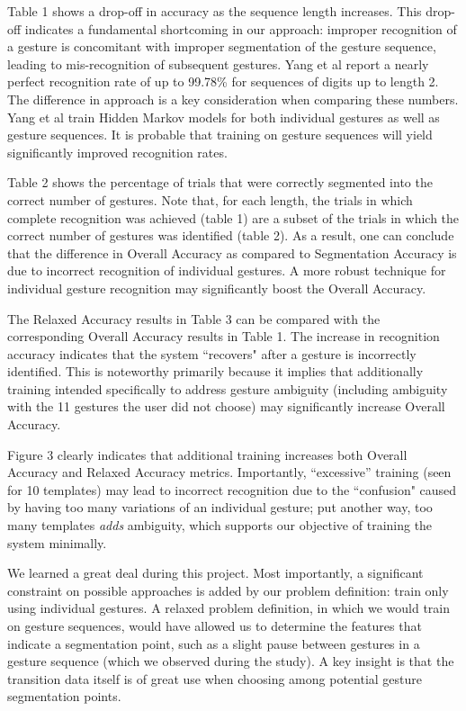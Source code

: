 \documentclass[twoside]{article}
\begin{document}
\begin{multicols}{2}
Table 1 shows a drop-off in accuracy as the sequence length increases. This
drop-off indicates a fundamental shortcoming in our approach: improper
recognition of a gesture is concomitant with improper segmentation of the
gesture sequence, leading to mis-recognition of subsequent gestures. Yang et al
\cite{yang_gesture_1994} report a nearly perfect recognition rate of up to
99.78\% for sequences of digits up to length 2. The difference in approach is a
key consideration when comparing these numbers. Yang et al train Hidden Markov
models for both individual gestures as well as gesture sequences. It is probable
that training on gesture sequences will yield significantly improved
recognition rates.

Table 2 shows the percentage of trials that were correctly segmented into the
correct number of gestures. Note that, for each length, the trials in which
complete recognition was achieved (table 1) are a subset of the trials in which
the correct number of gestures was identified (table 2). As a result, one can
conclude that the difference in Overall Accuracy as compared to Segmentation
Accuracy is due to incorrect recognition of individual gestures. A more robust
technique for individual gesture recognition may significantly boost the
Overall Accuracy.

The Relaxed Accuracy results in Table 3 can be compared with the corresponding
Overall Accuracy results in Table 1. The increase in recognition accuracy
indicates that the system ``recovers" after a gesture is incorrectly identified.
This is noteworthy primarily because it implies that additionally training
intended specifically to address gesture ambiguity (including ambiguity with the
11 gestures the user did not choose) may significantly increase Overall
Accuracy.

Figure 3 clearly indicates that additional training increases both Overall
Accuracy and Relaxed Accuracy metrics. Importantly, ``excessive'' training (seen
for 10 templates) may lead to incorrect recognition due to the ``confusion"
caused by having too many variations of an individual gesture; put another way,
too many templates \emph{adds} ambiguity, which supports our objective of training
the system minimally.

We learned a great deal during this project. Most importantly, a significant
constraint on possible approaches is added by our problem definition: train only
using individual gestures. A relaxed problem definition, in which we would
train on gesture sequences, would have allowed us to determine the features that
indicate a segmentation point, such as a slight pause between gestures in a
gesture sequence (which we observed during the study). A key insight is that the
transition data itself is of great use when choosing among potential gesture
segmentation points.


\end{multicols}
\end{document}
